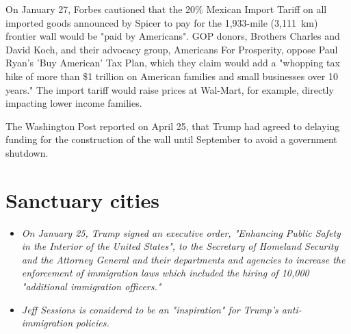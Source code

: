 On January 27, Forbes cautioned that the 20\% Mexican Import Tariff on
all imported goods announced by Spicer to pay for the 1,933-mile
(3,111~km) frontier wall would be "paid by Americans". GOP donors,
Brothers Charles and David Koch, and their advocacy group, Americans For
Prosperity, oppose Paul Ryan's 'Buy American' Tax Plan, which they claim
would add a "whopping tax hike of more than \$1 trillion on American
families and small businesses over 10 years." The import tariff would
raise prices at Wal-Mart, for example, directly impacting lower income
families.

The Washington Post reported on April 25, that Trump had agreed to
delaying funding for the construction of the wall until September to
avoid a government shutdown.

\section{Sanctuary cities}\label{sanctuary-cities}

\begin{itemize}
\item
  \emph{On January 25, Trump signed an executive order, "Enhancing
  Public Safety in the Interior of the United States", to the Secretary
  of Homeland Security and the Attorney General and their departments
  and agencies to increase the enforcement of immigration laws which
  included the hiring of 10,000 "additional immigration officers."}
\item
  \emph{Jeff Sessions is considered to be an "inspiration" for Trump's
  anti-immigration policies.}
\end{itemize}

